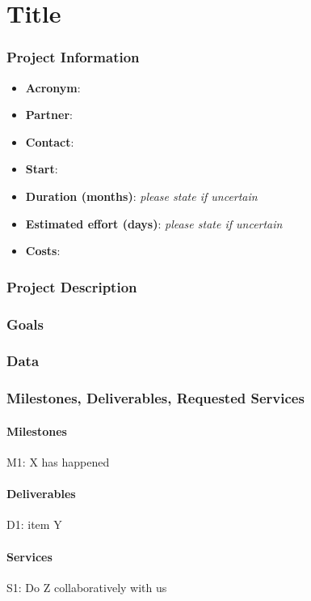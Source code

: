 \documentclass[
]{article}
\date{}
\providecommand{\tightlist}{%
  \setlength{\itemsep}{0pt}\setlength{\parskip}{0pt}}
\begin{document}
\hypertarget{title}{%
\section{Title}\label{title}}

\hypertarget{project-information}{%
\subsubsection{Project Information}\label{project-information}}

\begin{itemize}
\tightlist
\item
  \textbf{Acronym}:
\item
  \textbf{Partner}:
\item
  \textbf{Contact}:
\item
  \textbf{Start}:
\item
  \textbf{Duration (months)}: \emph{please state if uncertain}
\item
  \textbf{Estimated effort (days)}: \emph{please state if uncertain}
\item
  \textbf{Costs}:
\end{itemize}

\hypertarget{project-description}{%
\subsubsection{Project Description}\label{project-description}}

\hypertarget{goals}{%
\subsubsection{Goals}\label{goals}}

\hypertarget{data}{%
\subsubsection{Data}\label{data}}

\hypertarget{milestones-deliverables-requested-services}{%
\subsubsection{Milestones, Deliverables, Requested
Services}\label{milestones-deliverables-requested-services}}

\hypertarget{milestones}{%
\paragraph{Milestones}\label{milestones}}

M1: X has happened

\hypertarget{deliverables}{%
\paragraph{Deliverables}\label{deliverables}}

D1: item Y

\hypertarget{services}{%
\paragraph{Services}\label{services}}

S1: Do Z collaboratively with us
\end{document}
